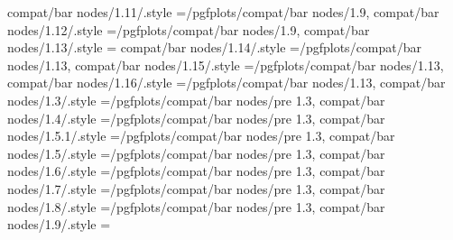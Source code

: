 {{{{compat/bar nodes/1.11/.style                                       ={/pgfplots/compat/bar nodes/1.9},                                                                                                 
compat/bar nodes/1.12/.style                                       ={/pgfplots/compat/bar nodes/1.9},                                                                                                 
compat/bar nodes/1.13/.style                                       ={                                                                                                                                  
compat/bar nodes/1.14/.style                                       ={/pgfplots/compat/bar nodes/1.13},                                                                                                
compat/bar nodes/1.15/.style                                       ={/pgfplots/compat/bar nodes/1.13},                                                                                                
compat/bar nodes/1.16/.style                                       ={/pgfplots/compat/bar nodes/1.13},                                                                                                
compat/bar nodes/1.3/.style                                        ={/pgfplots/compat/bar nodes/pre 1.3},                                                                                             
compat/bar nodes/1.4/.style                                        ={/pgfplots/compat/bar nodes/pre 1.3},                                                                                             
compat/bar nodes/1.5.1/.style                                      ={/pgfplots/compat/bar nodes/pre 1.3},                                                                                             
compat/bar nodes/1.5/.style                                        ={/pgfplots/compat/bar nodes/pre 1.3},                                                                                             
compat/bar nodes/1.6/.style                                        ={/pgfplots/compat/bar nodes/pre 1.3},                                                                                             
compat/bar nodes/1.7/.style                                        ={/pgfplots/compat/bar nodes/pre 1.3},                                                                                             
compat/bar nodes/1.8/.style                                        ={/pgfplots/compat/bar nodes/pre 1.3},                                                                                             
compat/bar nodes/1.9/.style                                        ={                                                                                                                                  
}}}}}}
